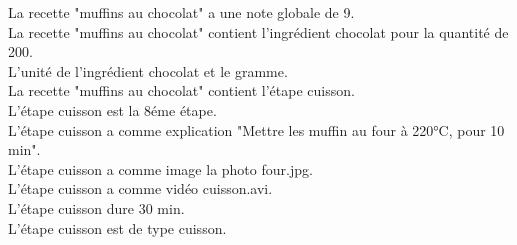 \documentclass[a4paper,10pt]{article}
\begin{document}
La recette "muffins au chocolat" a une note globale de 9.\\
La recette "muffins au chocolat" contient l'ingrédient chocolat pour la quantité de 200.\\
L'unité de l'ingrédient chocolat et le gramme.\\
La recette "muffins au chocolat" contient l'étape cuisson.\\
L'étape cuisson est la 8éme étape.\\
L'étape cuisson a comme explication "Mettre les muffin au four à 220°C, pour 10 min".\\
L'étape cuisson a comme image la photo four.jpg.\\
L'étape cuisson a comme vidéo cuisson.avi.\\
L'étape cuisson dure 30 min.\\
L'étape cuisson est de type cuisson.\\
\end{document}
